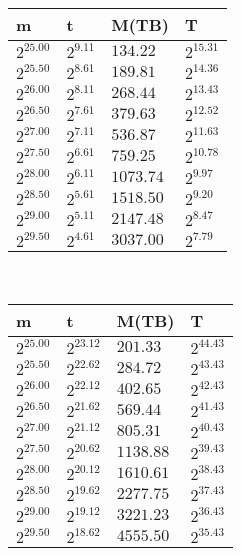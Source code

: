 \begin{tabular}{llll}
m & t & M(TB) & T \\ \hline
$2^{25.00}$ & $2^{9.11}$ & $134.22$ & $2^{15.31}$ \\
$2^{25.50}$ & $2^{8.61}$ & $189.81$ & $2^{14.36}$ \\
$2^{26.00}$ & $2^{8.11}$ & $268.44$ & $2^{13.43}$ \\
$2^{26.50}$ & $2^{7.61}$ & $379.63$ & $2^{12.52}$ \\
$2^{27.00}$ & $2^{7.11}$ & $536.87$ & $2^{11.63}$ \\
$2^{27.50}$ & $2^{6.61}$ & $759.25$ & $2^{10.78}$ \\
$2^{28.00}$ & $2^{6.11}$ & $1073.74$ & $2^{9.97}$ \\
$2^{28.50}$ & $2^{5.61}$ & $1518.50$ & $2^{9.20}$ \\
$2^{29.00}$ & $2^{5.11}$ & $2147.48$ & $2^{8.47}$ \\
$2^{29.50}$ & $2^{4.61}$ & $3037.00$ & $2^{7.79}$ \\
\end{tabular}
 \ 
\begin{tabular}{llll}
m & t & M(TB) & T \\ \hline
$2^{25.00}$ & $2^{23.12}$ & $201.33$ & $2^{44.43}$ \\
$2^{25.50}$ & $2^{22.62}$ & $284.72$ & $2^{43.43}$ \\
$2^{26.00}$ & $2^{22.12}$ & $402.65$ & $2^{42.43}$ \\
$2^{26.50}$ & $2^{21.62}$ & $569.44$ & $2^{41.43}$ \\
$2^{27.00}$ & $2^{21.12}$ & $805.31$ & $2^{40.43}$ \\
$2^{27.50}$ & $2^{20.62}$ & $1138.88$ & $2^{39.43}$ \\
$2^{28.00}$ & $2^{20.12}$ & $1610.61$ & $2^{38.43}$ \\
$2^{28.50}$ & $2^{19.62}$ & $2277.75$ & $2^{37.43}$ \\
$2^{29.00}$ & $2^{19.12}$ & $3221.23$ & $2^{36.43}$ \\
$2^{29.50}$ & $2^{18.62}$ & $4555.50$ & $2^{35.43}$ \\
\end{tabular}
 \ 
